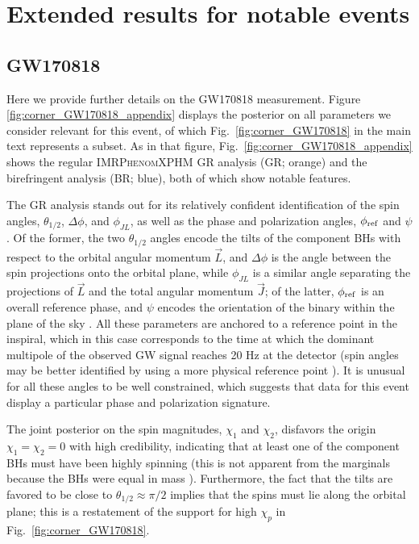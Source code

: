 \documentclass[aps,prd,twocolumn,superscriptaddress,preprintnumbers,nofootinbib]{revtex4-2}
\begin{document}
\appendix*

\section{Extended results for notable events}
\label{sec:Appendix}

\subsection{GW170818}
\label{sec:corner_GW170818_appendix}

Here we provide further details on the GW170818 measurement. 
Figure \ref{fig:corner_GW170818_appendix} displays the posterior on all parameters we consider relevant for this event, of which Fig.~\ref{fig:corner_GW170818} in the main text represents a subset.
As in that figure, Fig.~\ref{fig:corner_GW170818_appendix} shows the regular \textsc{IMRPhenomXPHM} \ac{GR} analysis (GR; orange) and the birefringent analysis (BR; blue), both of which show notable features.

The GR analysis stands out for its relatively confident identification of the spin angles, $\theta_{1/2}$, $\Delta \phi$, and $\phi_{JL}$, as well as the phase and polarization angles, $\phi_{\rm ref}$ and $\psi$.
Of the former, the two $\theta_{1/2}$ angles encode the tilts of the component \acp{BH} with respect to the orbital angular momentum $\vec{L}$, and $\Delta \phi$ is the angle between the spin projections onto the orbital plane, while $\phi_{JL}$ is a similar angle separating the projections of $\vec{L}$ and the total angular momentum $\vec{J}$;
of the latter, $\phi_{\rm ref}$ is an overall reference phase, and $\psi$ encodes the orientation of the binary within the plane of the sky \cite{Isi:2022mbx}.
All these parameters are anchored to a reference point in the inspiral, which in this case corresponds to the time at which the dominant multipole of the observed \ac{GW} signal reaches 20 Hz at the detector (spin angles may be better identified by using a more physical reference point \cite{Varma:2021csh}).
It is unusual for all these angles to be well constrained, which suggests that data for this event display a particular phase and polarization signature.

The joint posterior on the spin magnitudes, $\chi_1$ and $\chi_2$, disfavors the origin $\chi_1 = \chi_2 = 0$ with high credibility, indicating that at least one of the component \acp{BH} must have been highly spinning (this is not apparent from the marginals because the \acp{BH} were equal in mass \cite{Biscoveanu:2020are}).
Furthermore, the fact that the tilts are favored to be close to $\theta_{1/2} \approx \pi/2$ implies that the spins must lie along the orbital plane;
this is a restatement of the support for high $\chi_p$ in Fig.~\ref{fig:corner_GW170818}.
\end{document}
